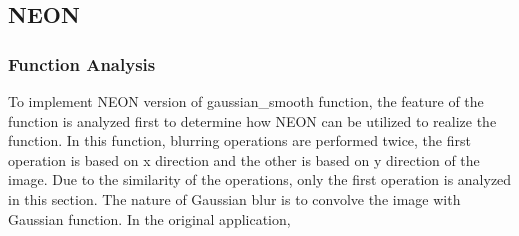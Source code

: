 \subsection{NEON}
\subsubsection{Function Analysis}
To implement NEON version of gaussian\_smooth function, the feature of the function is analyzed first to determine how NEON can be utilized to
realize the function. In this function, blurring operations are performed twice, the first operation is based on x direction and the other is based on y direction of the image. Due to the similarity of the operations, only the first operation is analyzed in this section. 
The nature of Gaussian blur is to convolve the image with Gaussian function. In the original application, 
